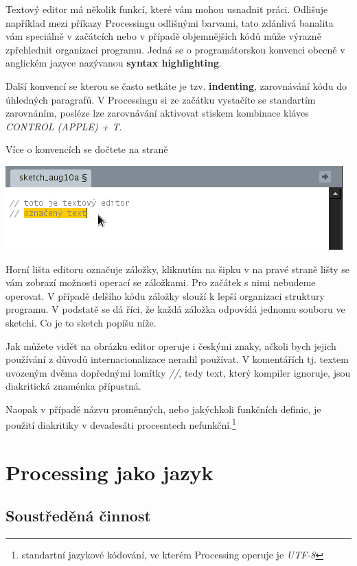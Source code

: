 \documentclass[12pt,twopage]{book}
\newcommand{\oddil}[1]{\section{#1}\label{sec:#1}}
\newcommand{\klavesy}[1]{\textsc{\em #1}}
\newcommand{\slovnik}[1]{\textbf{\gls{#1}}\index{#1}}
\begin{document}
Textový editor má několik funkcí, které vám mohou usnadnit práci. Odlišuje například mezi příkazy Processingu odlišnými barvami, tato zdánlivá banalita vám speciálně v začátcích nebo v případě objemnějších kódů může výrazně zpřehlednit organizaci programu. Jedná se o programátorskou konvenci obecně v anglickém jazyce nazývanou \slovnik{syntax highlighting}.


Další konvencí se kterou se často setkáte je tzv. \slovnik{indenting}, zarovnávání kódu do úhledných paragrafů. V Processingu si ze začátku vystačíte se standartím zarovnáním, posléze lze zarovnávání aktivovat stiskem kombinace kláves \klavesy{CONTROL (APPLE) + T}.

Více o konvencích se dočtete na straně~\pageref{Předmluva}

\begin{center}
\includegraphics[scale = 0.75]{imgs/editor.png}
\end{center}

Horní lišta editoru označuje záložky, kliknutím na šipku v na pravé straně lišty se vám zobrazí možnosti operací se záložkami. Pro začátek s nimi nebudeme operovat. V případě delšího kódu záložky slouží k lepší organizaci struktury programu. V podstatě se dá říci, že každá záložka odpovídá jednomu souboru ve sketchi. Co je to sketch popíšu níže.

Jak můžete vidět na obrázku editor operuje i českými znaky, ačkoli bych jejich používání z důvodů internacionalizace neradil používat. V komentářích tj. textem uvozeným dvěma dopřednými lomítky {\em //}, tedy text, který kompiler ignoruje, jsou diakritická znaménka přípustná.

Naopak v případě názvu proměnných, nebo jakýchkoli funkčních definic, je použití diakritiky v devadesáti procesntech nefunkční.\footnote{standartní jazykové kódování, ve kterém Processing operuje je {\em UTF-8}}




\chapter{Processing jako jazyk}

\oddil{Soustředěná činnost}
\end{document}
